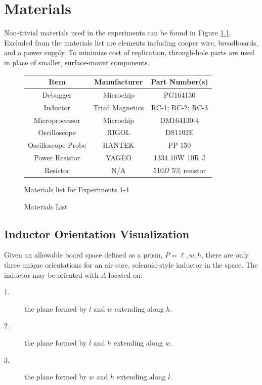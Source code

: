 \documentclass[11pt,oneside]{report}
\begin{document}
    \startappendices
    
    \chapter{Materials}\label{appendix:materials}
    Non-trivial materials used in the experiments can be found in Figure \ref{fig:Materials}. Excluded from the materials list are elements including cooper wire, breadboards, and a power supply. To minimize cost of replication, through-hole parts are used in place of smaller, surface-mount components.
    \begin{figure}[!htbp]
    	\centering	
    	\bgroup
    	\def\arraystretch{1.25}%
    	\begin{tabular}{| c | c | c |}
      		\hline			
      		Item & Manufacturer & Part Number(s)\\ \hline \hline \cline{1-3}
      		Debugger & Microchip & PG164130\\ \hline
      		Inductor & Triad Magnetics & RC-1; RC-2; RC-3\\ \hline
      		Microprocessor & Microchip & DM164130-4\\ \hline
      		Oscilloscope & RIGOL & DS1102E\\ \hline
      		Oscilloscope Probe & HANTEK & PP-150\\  \hline  
      		Power Resistor & YAGEO & 1334 10W 10R J\\  \hline  
      		Resistor & N/A & 510$\Omega$ 5\% resistor\\  \hline  
    	\end{tabular}
    	\egroup
        \caption{Materials List}Materials list for Experiments 1-4
        \label{fig:Materials}
    \end{figure}

    \section{Inductor Orientation Visualization}\label{appendix:orientation-visualization}
    Given an allowable board space defined as a prism, $P = {\ell, w, h}$, there are only three unique orientations for an air-core, solenoid-style inductor in the space. The inductor may be oriented with $A$ located on:
    \begin{description}
    \item[1.] the plane formed by $l$ and $w$ extending along $h$.
    \item[2.] the plane formed by $l$ and $h$ extending along $w$.
    \item[3.] the plane formed by $w$ and $h$ extending along $l$.
    \end{description}
\end{document}
